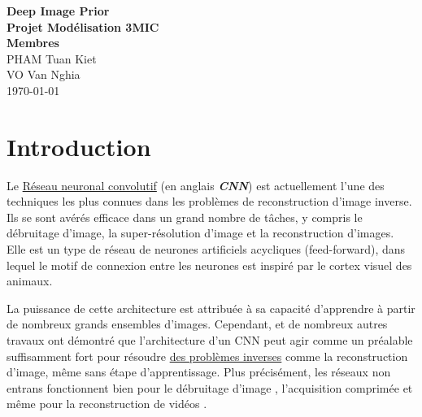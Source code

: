 \documentclass[
  12pt,
  dvipsnames]{article}
\author{}
\date{\vspace{-2.5em}}
\begin{document}
\onehalfspacing


\begin{titlepage}
\vspace*{\fill}
\begin{center}
\LARGE{\textbf{Deep Image Prior}}\\
\Large{\textbf{Projet Modélisation 3MIC}}\\
\vspace*{1\baselineskip}
\Large{\textbf{Membres}}\\
PHAM Tuan Kiet\\
VO Van Nghia\\
\vfill %
\vspace*{\fill}
\today
\end{center}
\end{titlepage}

\newpage

\newpage
{}
\tableofcontents
{}

\listoffigures

\newpage
{}

\hypertarget{introduction}{%
\section{Introduction}\label{introduction}}

Le \protect\hyperlink{ruxe9seau-neuronal-convolutif}{Réseau neuronal convolutif} (en anglais \textbf{\emph{CNN}}) est actuellement l'une des techniques les plus connues dans les problèmes de reconstruction d'image inverse. Ils se sont avérés efficace dans un grand nombre de tâches, y compris le débruitage d'image, la super-résolution d'image et la reconstruction d'images. Elle est un type de réseau de neurones artificiels acycliques (feed-forward), dans lequel le motif de connexion entre les neurones est inspiré par le cortex visuel des animaux.

La puissance de cette architecture est attribuée à sa capacité d'apprendre à partir de nombreux grands ensembles d'images. Cependant, \autocite{2007.02471,1711.10925} et de nombreux autres travaux ont démontré que l'architecture d'un CNN peut agir comme un préalable suffisamment fort pour résoudre \protect\hyperlink{les-probluxe8mes-inverses}{des problèmes inverses} comme la reconstruction d'image, même sans étape d'apprentissage. Plus précisément, les réseaux non entrans fonctionnent bien pour le débruitage d'image \autocite{2007.02471}, l'acquisition comprimée \autocite{1806.06438} et même pour la reconstruction de vidéos \autocite{1910.01684}.
\end{document}
